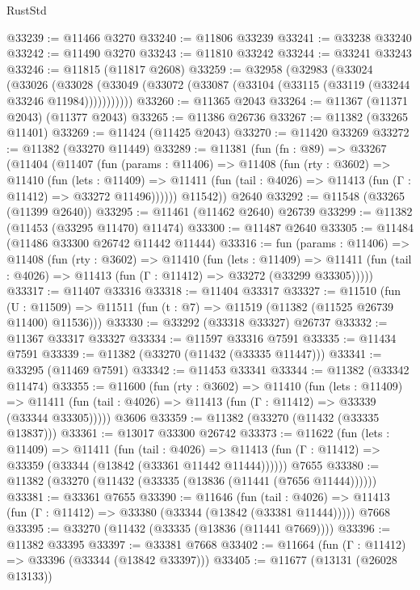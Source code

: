 \begin{lexlean}{RustStd}
\begin{coremodule}
@33239 := @11466 @3270
@33240 := @11806 @33239
@33241 := @33238 @33240
@33242 := @11490 @3270
@33243 := @11810 @33242
@33244 := @33241 @33243
@33246 := @11815 (@11817 @2608)
@33259 := @32958
    (@32983
      (@33024
        (@33026
          (@33028 (@33049 (@33072 (@33087 (@33104 (@33115 (@33119 (@33244 @33246 @11984)))))))))))
@33260 := @11365 @2043
@33264 := @11367 (@11371 @2043) (@11377 @2043)
@33265 := @11386 @26736
@33267 := @11382 (@33265 @11401)
@33269 := @11424 (@11425 @2043)
@33270 := @11420 @33269
@33272 := @11382 (@33270 @11449)
@33289 := @11381
    (fun (fn : @89) =>
    @33267
      (@11404
        (@11407
          (fun (params : @11406) =>
          @11408
            (fun (rty : @3602) =>
            @11410
              (fun (lets : @11409) =>
              @11411 (fun (tail : @4026) => @11413 (fun (Γ : @11412) => @33272 @11496))))))
        @11542))
    @2640
@33292 := @11548 (@33265 (@11399 @2640))
@33295 := @11461 (@11462 @2640) @26739
@33299 := @11382 (@11453 (@33295 @11470) @11474)
@33300 := @11487 @2640
@33305 := @11484 (@11486 @33300 @26742 @11442 @11444)
@33316 := fun (params : @11406) =>
  @11408
    (fun (rty : @3602) =>
    @11410
      (fun (lets : @11409) =>
      @11411 (fun (tail : @4026) => @11413 (fun (Γ : @11412) => @33272 (@33299 @33305)))))
@33317 := @11407 @33316
@33318 := @11404 @33317
@33327 := @11510
    (fun (U : @11509) => @11511 (fun (t : @7) => @11519 (@11382 (@11525 @26739 @11400) @11536)))
@33330 := @33292 (@33318 @33327) @26737
@33332 := @11367 @33317 @33327
@33334 := @11597 @33316 @7591
@33335 := @11434 @7591
@33339 := @11382 (@33270 (@11432 (@33335 @11447)))
@33341 := @33295 (@11469 @7591)
@33342 := @11453 @33341
@33344 := @11382 (@33342 @11474)
@33355 := @11600
    (fun (rty : @3602) =>
    @11410
      (fun (lets : @11409) =>
      @11411 (fun (tail : @4026) => @11413 (fun (Γ : @11412) => @33339 (@33344 @33305)))))
    @3606
@33359 := @11382 (@33270 (@11432 (@33335 @13837)))
@33361 := @13017 @33300 @26742
@33373 := @11622
    (fun (lets : @11409) =>
    @11411
      (fun (tail : @4026) =>
      @11413 (fun (Γ : @11412) => @33359 (@33344 (@13842 (@33361 @11442 @11444))))))
    @7655
@33380 := @11382 (@33270 (@11432 (@33335 (@13836 (@11441 (@7656 @11444))))))
@33381 := @33361 @7655
@33390 := @11646
    (fun (tail : @4026) => @11413 (fun (Γ : @11412) => @33380 (@33344 (@13842 (@33381 @11444)))))
    @7668
@33395 := @33270 (@11432 (@33335 (@13836 (@11441 @7669))))
@33396 := @11382 @33395
@33397 := @33381 @7668
@33402 := @11664 (fun (Γ : @11412) => @33396 (@33344 (@13842 @33397)))
@33405 := @11677 (@13131 (@26028 @13133))

\end{coremodule}
\end{lexlean}

